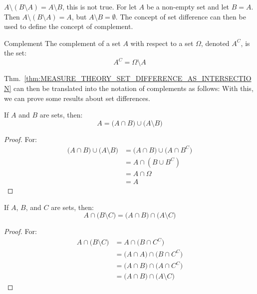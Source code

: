         $A\setminus(B\setminus{A})=A\setminus{B}$, this is not true. For
        let $A$ be a non-empty set and let $B=A$. Then
        $A\setminus(B\setminus{A})=A$, but $A\setminus{B}=\emptyset$.
        The concept of set difference can then be used to define the
        concept of complement.
        \begin{ldefinition}{Complement}
            The complement of a set $A$ with respect to a set
            $\Omega$, denoted $A^{C}$, is the set:
            \begin{equation}
                A^{C}=\Omega\setminus{A}
            \end{equation}
        \end{ldefinition}
        Thm.~\ref{thm:MEASURE_THEORY_SET_DIFFERENCE_AS_INTERSECTION} can then
        be translated into the notation of complements as follows:
        With this, we can prove some results about set differences.
        \begin{theorem}
            If $A$ and $B$ are sets, then:
            \begin{equation}
                A=\big(A\cap{B}\big)\cup\big(A\setminus{B}\big)
            \end{equation}
        \end{theorem}
        \begin{proof}
            For:
            \begin{subequations}
                \begin{align}
                    \big(A\cap{B})\cup\big(A\setminus{B}\big)
                    &=\big(A\cap{B}\big)\cup\big(A\cap{B}^{C}\big)\\
                    &=A\cap(B\cup{B}^{C})\\
                    &=A\cap\Omega\\
                    &=A
                \end{align}
            \end{subequations}
        \end{proof}
        \begin{theorem}
            If $A$, $B$, and $C$ are sets, then:
            \begin{equation}
                A\cap\big(B\setminus{C}\big)
                =\big(A\cap{B}\big)\cap\big(A\setminus{C}\big)
            \end{equation}
        \end{theorem}
        \begin{proof}
            For:
            \begin{subequations}
                \begin{align}
                    A\cap\big(B\setminus{C}\big)
                    &=A\cap\big(B\cap{C}^{C}\big)\\
                    &=\big(A\cap{A}\big)\cap\big(B\cap{C}^{C}\big)\\
                    &=\big(A\cap{B}\big)\cap\big(A\cap{C}^{C}\big)\\
                    &=\big(A\cap{B}\big)\cap\big(A\setminus{C}\big)
                \end{align}
            \end{subequations}
        \end{proof}
